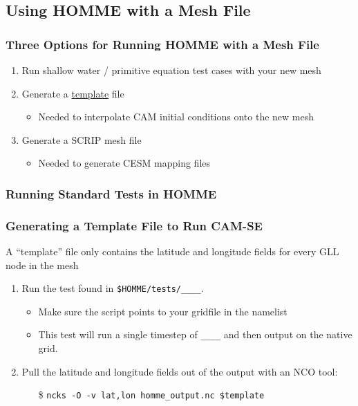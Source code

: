 \documentclass{beamer}
\newcommand{\template}{\hyperlink{template}{template}}
\begin{document}
\subsection{Using HOMME with a Mesh File}
\begin{frame}
\frametitle{Three Options for Running HOMME with a Mesh File}
\begin{block}{}
\begin{enumerate}
\item Run shallow water / primitive equation test cases with your new mesh
\item Generate a \template{} file
\begin{itemize}
\item Needed to interpolate CAM initial conditions onto the new mesh
\end{itemize}
\item Generate a SCRIP mesh file
\begin{itemize}
\item Needed to generate CESM mapping files
\end{itemize}
\end{enumerate}
\end{block}
\end{frame}
%
\begin{frame}
\frametitle{Running Standard Tests in HOMME}
\end{frame}
%
\hypertarget{template}{}
\begin{frame}
\frametitle{Generating a Template File to Run CAM-SE}
A ``template'' file only contains the latitude and longitude fields for every GLL node in the mesh
\begin{block}{}
\begin{enumerate}
\item Run the test found in \texttt{\$HOMME/tests/\_\_\_\_}.
\begin{itemize}
\item Make sure the script points to your gridfile in the namelist
\item This test will run a single timestep of \texttt{\_\_\_\_} and then output on the native grid.
\end{itemize}
\item Pull the latitude and longitude fields out of the output with an NCO tool:
\begin{itemize}
\item[\$] \texttt{ncks -O -v lat,lon homme\_output.nc \$template}
\end{itemize}
\end{enumerate}
\end{block}
\end{frame}
\end{document}
